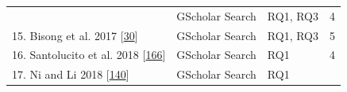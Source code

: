 \documentclass[]{book}
\begin{document}
\begin{longtable}[]{@{}llll@{}}
\begin{minipage}[t]{0.48\columnwidth}
\end{minipage} & \begin{minipage}[t]{0.20\columnwidth}\raggedright\strut
GScholar Search\strut
\end{minipage} & \begin{minipage}[t]{0.14\columnwidth}\raggedright\strut
RQ1, RQ3\strut
\end{minipage} & \begin{minipage}[t]{0.06\columnwidth}\raggedright\strut
4\strut
\end{minipage}\tabularnewline
\begin{minipage}[t]{0.48\columnwidth}\raggedright\strut
15. Bisong et al. 2017
{[}\protect\hyperlink{ref-bisong2017built}{30}{]}\strut
\end{minipage} & \begin{minipage}[t]{0.20\columnwidth}\raggedright\strut
GScholar Search\strut
\end{minipage} & \begin{minipage}[t]{0.14\columnwidth}\raggedright\strut
RQ1, RQ3\strut
\end{minipage} & \begin{minipage}[t]{0.06\columnwidth}\raggedright\strut
5\strut
\end{minipage}\tabularnewline
\begin{minipage}[t]{0.48\columnwidth}\raggedright\strut
16. Santolucito et al. 2018
{[}\protect\hyperlink{ref-santolucito2018statically}{166}{]}\strut
\end{minipage} & \begin{minipage}[t]{0.20\columnwidth}\raggedright\strut
GScholar Search\strut
\end{minipage} & \begin{minipage}[t]{0.14\columnwidth}\raggedright\strut
RQ1\strut
\end{minipage} & \begin{minipage}[t]{0.06\columnwidth}\raggedright\strut
4\strut
\end{minipage}\tabularnewline
\begin{minipage}[t]{0.48\columnwidth}\raggedright\strut
17. Ni and Li 2018 {[}\protect\hyperlink{ref-ni2018acona}{140}{]}\strut
\end{minipage} & \begin{minipage}[t]{0.20\columnwidth}\raggedright\strut
GScholar Search\strut
\end{minipage} & \begin{minipage}[t]{0.14\columnwidth}\raggedright\strut
RQ1\strut
\end{minipage} & \begin{minipage}[t]{0.06\columnwidth}\raggedright\strut

\end{minipage}
\end{longtable}
\end{document}
